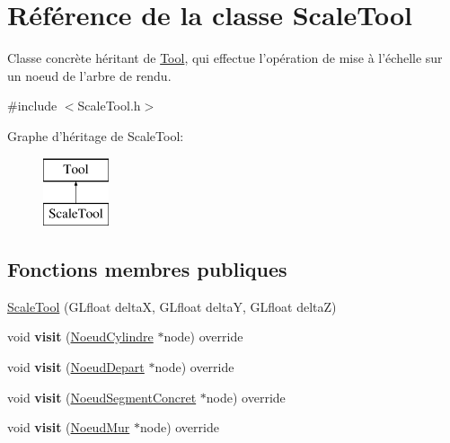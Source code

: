 \hypertarget{class_scale_tool}{\section{Référence de la classe Scale\-Tool}
\label{class_scale_tool}
}


Classe concrète héritant de \hyperlink{class_tool}{Tool}, qui effectue l'opération de mise à l'échelle sur un noeud de l'arbre de rendu.  




{\ttfamily \#include $<$Scale\-Tool.\-h$>$}

Graphe d'héritage de Scale\-Tool\-:\begin{figure}[H]
\begin{center}
\leavevmode
\includegraphics[height=2.000000cm]{class_scale_tool}
\end{center}
\end{figure}
\subsection*{Fonctions membres publiques}
\begin{DoxyCompactItemize}
\item 
\hyperlink{group__inf2990_ga87222e8bea8ff2b71862e5993d1a3669}{Scale\-Tool} (G\-Lfloat delta\-X, G\-Lfloat delta\-Y, G\-Lfloat delta\-Z)
\item 
\hypertarget{group__inf2990_gab8949c8d5e040c10f62d385129a586f2}{void {\bfseries visit} (\hyperlink{class_noeud_cylindre}{Noeud\-Cylindre} $\ast$node) override}\label{group__inf2990_gab8949c8d5e040c10f62d385129a586f2}

\item 
\hypertarget{group__inf2990_ga15d28436292d75172260ec68ae29807c}{void {\bfseries visit} (\hyperlink{class_noeud_depart}{Noeud\-Depart} $\ast$node) override}\label{group__inf2990_ga15d28436292d75172260ec68ae29807c}

\item 
\hypertarget{group__inf2990_ga72ea4561dcc66cbdc0a9d52e12c7be90}{void {\bfseries visit} (\hyperlink{class_noeud_segment_concret}{Noeud\-Segment\-Concret} $\ast$node) override}\label{group__inf2990_ga72ea4561dcc66cbdc0a9d52e12c7be90}

\item 
\hypertarget{group__inf2990_ga376afcceadc7462902ff0e3bad3573e9}{void {\bfseries visit} (\hyperlink{class_noeud_mur}{Noeud\-Mur} $\ast$node) override}\label{group__inf2990_ga376afcceadc7462902ff0e3bad3573e9}

\end{DoxyCompactItemize}


